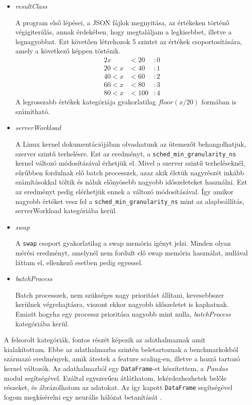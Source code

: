\begin{itemize}
\item \textit{resultClass}

A program első lépései, a JSON fájlok megnyitása, az értékeken történő végigiterálás, annak érdekében, hogy megtaláljam a legkisebbet, illetve a legnagyobbat. Ezt követően létrehozok 5 szintet az értékek csoportosítására, amely a következő képpen történik.
\begin{alignat*}{2}
         x& < 20 &: 0 \\
    20 < x& < 40 &: 1 \\
    40 < x& < 60 &: 2 \\
    60 < x& < 80 &: 3 \\
    80 < x& < 100&: 4
\end{alignat*}
A legrosszabb értékek kategóriája gyakorlatilag $floor(x / 20)$ formában is számítható.

\item \textit{serverWorkload}

A Linux kernel dokumentációjában olvashatunk az ütemezőt behangolhatjuk, szerver szintű terhelésre. Ezt az eredményt, a \texttt{sched\_min\_granularity\_ns} kernel változó módosításával érhetjük el.
Mivel a szerver szintű terheléseknél, sűrűbben fordulnak elő batch processzek, azaz akik életük nagyrészét inkább számításokkal töltik és náluk előnyösebb nagyobb időszeleteket használni. Ezt az eredményt pedig elérhetjük ennek a változó módosításával. Így amikor nagyobb értéket vesz fel a \texttt{sched\_min\_granularity\_ns} mint az alapbeállítás, serverWorkload kategóriába kerül.
\item \textit{swap} 

A \texttt{swap} csoport gyakorlatilag a swap memória igényt jelzi. 
Minden olyan mérési eredményt, amelynél nem fordult elő swap memória használat, nullával láttam el, ellenkező esetben pedig egyessel.
\item \textit{batchProcess}

Batch processzek, nem szükséges nagy prioritást állítani, kevesebbszer kerülnek végrehajtásra, viszont ekkor nagyobb időszeletet is kaphatnak. Emiatt hogyha egy processz prioritása nagyobb mint nulla, \textit{batchProcess} kategóriába kerül.
\end{itemize}

A felsorolt kategóriák, fontos részét képezik az adathalmaznak amit kialakítottam. Ebbe az adathalmazba szintén beletartoznak a benchmarkokból származó eredmények, amik átestek a feature scaling-en, illetve a hozzá tartozó kernel változók. Az adathalmazból egy \texttt{DataFrame}-et készítettem, a \textit{Pandas} modul segítségével. Ezáltal egyszerűen átláthatom, lekérdezhezhetek belőle részeket, és ábrázolhatom az adatokat.
Az így kapott \texttt{DataFrame} segítségével fogom megkísérelni egy neurális hálózat betanítását \cite{geron2019hands}. 

